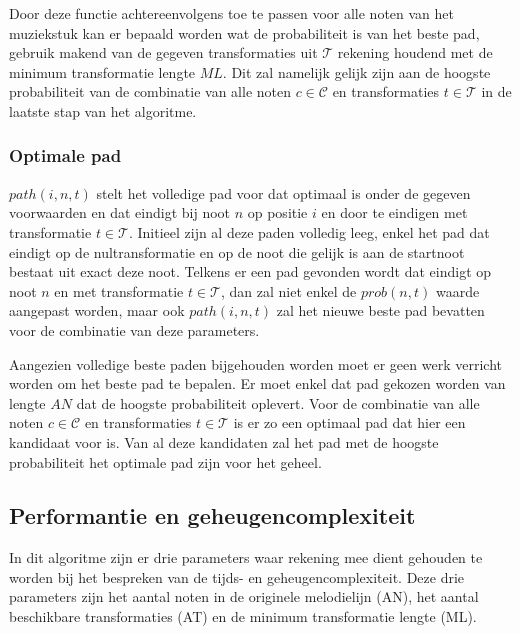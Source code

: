 Door deze functie achtereenvolgens toe te passen voor alle noten van het muziekstuk kan er bepaald worden wat de probabiliteit is van het beste pad, gebruik makend van de gegeven transformaties uit $\mathcal{T}$ rekening houdend met de minimum transformatie lengte $ML$. Dit zal namelijk gelijk zijn aan de hoogste probabiliteit van de combinatie van alle noten $c\in \mathcal{C}$ en transformaties $t\in \mathcal{T}$ in de laatste stap van het algoritme.

\subsubsection{Optimale pad}
$path(i,n,t)$ stelt het volledige pad voor dat optimaal is onder de gegeven voorwaarden en dat eindigt bij noot $n$ op positie $i$ en door te eindigen met transformatie $t\in \mathcal{T}$. Initieel zijn al deze paden volledig leeg, enkel het pad dat eindigt op de nultransformatie en op de noot die gelijk is aan de startnoot bestaat uit exact deze noot. Telkens er een pad gevonden wordt dat eindigt op  noot $n$ en met transformatie $t\in \mathcal{T}$, dan zal niet enkel de $prob(n,t)$ waarde aangepast worden, maar ook $path(i,n,t)$ zal het nieuwe beste pad bevatten voor de combinatie van deze parameters.

Aangezien volledige beste paden bijgehouden worden moet er geen werk verricht worden om het beste pad te bepalen. Er moet enkel dat pad gekozen worden van lengte $AN$ dat de hoogste probabiliteit oplevert. Voor de combinatie van alle noten $c\in \mathcal{C}$ en transformaties $t\in \mathcal{T}$ is er zo een optimaal pad dat hier een kandidaat voor is. Van al deze kandidaten zal het pad met de hoogste probabiliteit het optimale pad zijn voor het geheel.

\subsection{Performantie en geheugencomplexiteit}
In dit algoritme zijn er drie parameters waar rekening mee dient gehouden te worden bij het bespreken van de tijds- en geheugencomplexiteit. Deze drie parameters zijn het aantal noten in de originele melodielijn (AN), het aantal beschikbare transformaties (AT) en de minimum transformatie lengte (ML).

